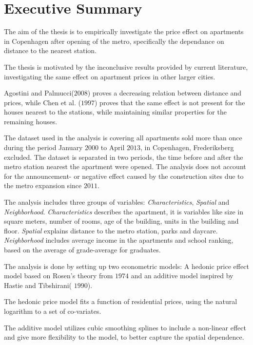 \section{Executive Summary}
The aim of the thesis is to empirically investigate the price effect on 
apartments in Copenhagen after opening of the metro, specifically the dependance
on distance to the nearest station.

The thesis is motivated by the inconclusive results provided by current 
literature, investigating the same effect on apartment prices in other larger 
cities. 

Agostini and Palmucci($2008$) proves a decreasing relation between 
distance and prices, while Chen et al. ($1997$) proves that the same effect is 
not present for the houses nearest to the stations, while maintaining similar 
properties for the remaining houses.

The dataset used in the analysis is covering all apartments sold more than once 
during the period January $2000$ to April $2013$, in Copenhagen, Frederiksberg 
excluded. The dataset is separated in two periods, the time before and after the 
metro station nearest the apartment were opened. The analysis does not account 
for the announcement- or negative effect caused by the construction sites 
due to the metro expansion since $2011$.  
 
The analysis includes three groups of variables: \textit{Characteristics}, 
\textit{Spatial} and \textit{Neighborhood}. \textit{Characteristics} describes the apartment, it is variables like size in 
square meters, number of rooms, age of the building, units in the building and 
floor. \textit{Spatial} explains distance to the metro station, parks and 
daycare. \textit{Neighborhood} includes average income in the apartments 
and school ranking, based on the average of grade-average for graduates. 


The analysis is done by setting up two econometric models:  A 
hedonic price effect model based on Rosen's theory from $1974$ and an additive model 
inspired by Hastie and Tibshirani( $1990$). 

The hedonic price model fits a function of residential prices, using the natural 
logarithm to a set of co-variates. 

The additive model utilizes cubic smoothing splines to include a non-linear effect
and give more flexibility to the model, to better capture the spatial dependence. 

